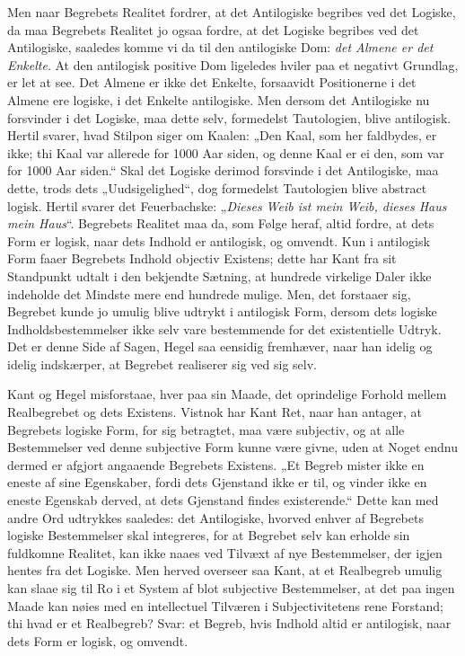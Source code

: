 \documentclass[11pt]{book}
\newcommand{\opage}[1]{\marginnote{\footnotesize\textit{[#1]}}}
\begin{document}
Men naar Begrebets Realitet fordrer, at det Antilogiske begribes ved
det Logiske, da maa Begrebets Realitet jo ogsaa fordre, at det Logiske
begribes ved det Antilogiske, saaledes komme vi da til den antilogiske
Dom: \emph{det Almene er det Enkelte}. At den antilogisk positive Dom
ligeledes hviler paa et negativt Grundlag, er let at see. Det Almene
er ikke det Enkelte, forsaavidt Positionerne i det Almene ere logiske,
i det Enkelte antilogiske. Men dersom det Antilogiske nu forsvinder i
det Logiske, maa dette selv, formedelst Tautologien, blive antilogisk.
Hertil svarer, hvad Stilpon siger om Kaalen: „Den Kaal, som her
faldbydes, er ikke; thi Kaal var allerede
\opage{162} \setcounter{footnote}{0}%
for 1000 Aar siden, og denne Kaal er ei den, som var for 1000 Aar
siden.“ Skal det Logiske derimod forsvinde i det Antilogiske, maa
dette, trods dets „Uudsigelighed“, dog formedelst Tautologien blive
abstract logisk. Hertil svarer det Feuerbachske: „\emph{Dieses Weib
ist mein Weib, dieses Haus mein Haus}“. Begrebets Realitet maa da, som
Følge heraf, altid fordre, at dets Form er logisk, naar dets Indhold
er antilogisk, og omvendt. Kun i antilogisk Form faaer Begrebets
Indhold objectiv Existens; dette har Kant fra sit Standpunkt udtalt i
den bekjendte Sætning, at hundrede virkelige Daler ikke indeholde det
Mindste mere end hundrede mulige. Men, det forstaaer sig, Begrebet
kunde jo umulig blive udtrykt i antilogisk Form, dersom dets logiske
Indholdsbestemmelser ikke selv vare bestemmende for det existentielle
Udtryk. Det er denne Side af Sagen, Hegel saa eensidig fremhæver, naar
han idelig og idelig indskærper, at Begrebet realiserer sig ved sig
selv.

Kant og Hegel misforstaae, hver paa sin Maade, det oprindelige Forhold
mellem Realbegrebet og dets Existens. Vistnok har Kant Ret, naar han
antager, at Begrebets logiske Form, for sig betragtet, maa være
subjectiv, og at alle Bestemmelser ved denne subjective Form kunne
være givne, uden at Noget endnu dermed er afgjort angaaende Begrebets
Existens. „Et Begreb mister ikke en eneste af sine Egenskaber, fordi
dets Gjenstand ikke er til, og vinder ikke en eneste Egenskab derved,
at dets Gjenstand findes existerende.“ Dette kan med andre Ord
udtrykkes saaledes: det Antilogiske, hvorved enhver af Begrebets
logiske Bestemmelser skal integreres, for at Begrebet selv kan erholde
sin fuldkomne Realitet, kan ikke naaes ved Tilvæxt af nye
Bestemmelser, der igjen hentes fra det Logiske. Men herved overseer
saa Kant, at et Realbegreb umulig kan slaae sig til Ro i et System af
blot subjective Bestemmelser, at det paa ingen Maade kan nøies med en
intellectuel Tilværen i Subjectivitetens rene Forstand; thi
\opage{163} \setcounter{footnote}{0}%
hvad er et Realbegreb? Svar: et Begreb, hvis Indhold altid er
antilogisk, naar dets Form er logisk, og omvendt.
\end{document}
